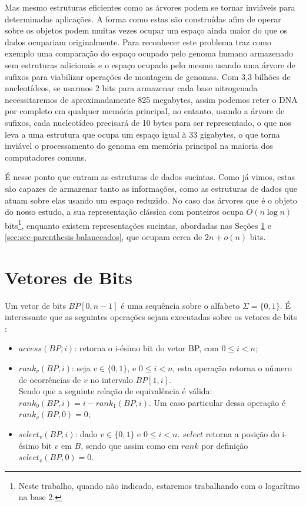 Mas mesmo estruturas eficientes como as árvores podem se tornar inviáveis para determinadas aplicações. A forma como estas são construídas afim de operar sobre os objetos podem muitas vezes ocupar um espaço ainda maior do que os dados ocupariam originalmente. Para reconhecer este problema \citet{book-compact-data-structures} traz como exemplo uma comparação do espaço ocupado pelo genoma humano armazenado sem estruturas adicionais e o espaço ocupado pelo mesmo usando uma árvore de sufixos para
viabilizar operações de montagem de genomas. Com  3,3 bilhões de nucleotídeos, se usarmos 2 bits para armazenar cada base nitrogenada necessitaremos de aproximadamente 825 megabytes, assim podemos reter o DNA por completo em qualquer memória principal, no entanto, usando a árvore de sufixos, cada nucleotídeo precisará de 10 bytes para ser representado, o que nos leva a uma estrutura que ocupa um espaço igual à 33 gigabytes, o que torna inviável o processamento do genoma em memória principal na maioria dos computadores comuns. %

É nesse ponto que entram as estruturas de dados sucintas. Como já vimos, estas são capazes de armazenar tanto as informações, como as estruturas de dados que atuam sobre elas usando um espaço reduzido. No caso das árvores que é o objeto do nosso estudo, a sua representação clássica com ponteiros  ocupa  $O(n \log n)$ bits\footnote{Neste
trabalho, quando não indicado, estaremos trabalhando com o logarítmo na base 2.}, enquanto existem representações sucintas, abordadas nas Seções \ref{sec:sec-bitvector} e \ref{sec:sec-parenthesis-balanceados}, que ocupam cerca de $2n+o(n)$ bits.

\section{Vetores de Bits}\label{sec:sec-bitvector}
Um vetor de bits $BP[0,n-1]$  é uma sequência sobre o alfabeto $\Sigma = \{0,1\}$. É interessante que as seguintes operações sejam executadas sobre os vetores de bits \citep{book-compact-data-structures}:

\begin{itemize}
    \item $access(BP,i)$: retorna o i-ésimo bit do vetor BP, com $0 \leq i < n$;
    \item $rank_v(BP,i)$: seja $v \in \{0,1\}$, e $0 \leq i < n$, esta operação retorna o número de ocorrências de $v$ no intervalo $BP[1,i]$.\\
    Sendo que a seguinte relação de equivalência é válida: $rank_0(BP,i)=i - rank_1(BP,i)$. Um caso particular dessa operação é $rank_v(BP,0)=0$;
    \item $select_v(BP,i)$: dado $v \in \{0,1\}$ e $0 \leq i < n$. $select$ retorna a posição do i-ésimo bit $v$ em $B$, sendo que assim como em $rank$ por definição $select_v(BP,0)=0$.
\end{itemize}

